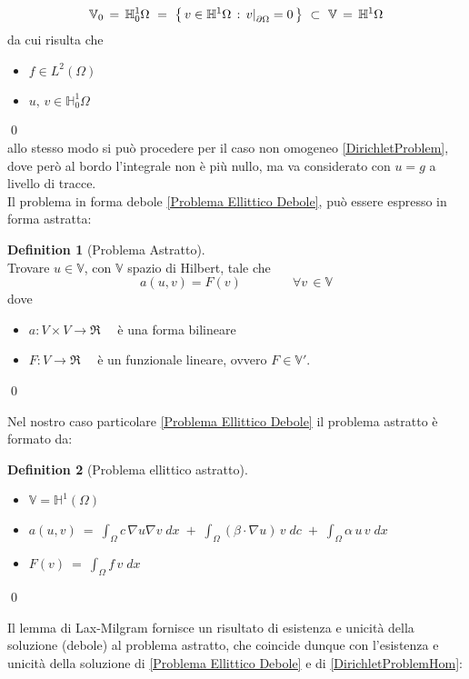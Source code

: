 \documentclass[12pt,a4paper]{report}
\theoremstyle{theorem}
\theoremstyle{definition}
\newtheorem{definition}{Definition}[section]
\newcommand\restr[2]{{%
  \left.\kern-\nulldelimiterspace %
  #1 %
  \right|_{#2} %
  }}
\begin{document}
\[  \mathbb{V}_{0} \, = \, \mathbb{H}_{0}^1{\Omega} \ = \ \left \{ \, v \in \mathbb{H}^1{\Omega} \, :  \, \restr{v}{\partial \Omega} = 0 \, \right \} \ \subset \  \mathbb{V} \, = \, \mathbb{H}^1{\Omega} \]
da cui risulta che
\begin{itemize}
	\item $f \in L^{2}(\Omega)$
	\item $u, \, v \in \mathbb{H}_{0}^1{\Omega}$
\end{itemize}
\qed
\hfill \\
allo stesso modo si può procedere per il caso non omogeneo \ref{DirichletProblem}, dove però al bordo l'integrale non è più nullo, ma va considerato con $u = g$ a livello di tracce.
\hfill \\
Il problema in forma debole \ref{Problema Ellittico Debole}, può essere espresso in forma astratta:
\begin{definition} [Problema Astratto] \label{Problema Astratto}
\hfill \\
Trovare $u \in  \mathbb{V}$, con $\mathbb{V}$ spazio di Hilbert, tale che
\[ a(u,v) = F(v) \qquad \qquad \forall v \, \in \mathbb{V} \]
dove
\begin{itemize}
	\item $a: V \times V \rightarrow \Re \quad $ è una forma bilineare 
	\item $F: V \rightarrow \Re \quad $ è un funzionale lineare, ovvero $F \in \mathbb{V}'$.
\end{itemize}
\qed
\end{definition}
Nel nostro caso particolare \ref{Problema Ellittico Debole}  il problema astratto è formato da:
\begin{definition} [Problema ellittico astratto] \label{Problema Ellittico Astratto}
\begin{itemize}
	\item $\mathbb{V} = \mathbb{H}^1(\Omega)$
	\item $a(u,v) \ = \ \int_{\Omega}{c \, \nabla u \nabla v \; dx} \; + \; \int_{\Omega}{(\beta \cdot \nabla u) \, v \; dc} \; + \; \int_{\Omega}{\alpha \, u \, v \; dx}$
	\item $F(v) \ = \ \int_{\Omega}{f \, v \; dx}$
\end{itemize}
\qed
\end{definition}
Il lemma di Lax-Milgram fornisce un risultato di esistenza e unicità della soluzione (debole) al problema astratto, che coincide dunque con l'esistenza e unicità della soluzione di \ref{Problema Ellittico Debole} e di \ref{DirichletProblemHom}:
\end{document}
